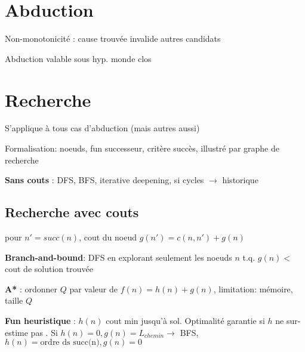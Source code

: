 \section*{Abduction}

Non-monotonicité : cause trouvée invalide autres candidats

Abduction valable sous hyp. monde clos

\section*{Recherche}

S'applique à tous cas d'abduction (mais autres aussi)

Formalisation: noeuds, fun successeur, critère succès, illustré par graphe de recherche

\textbf{Sans couts} : DFS, BFS, iterative deepening, si cycles $\rightarrow$ historique

\subsection*{Recherche avec couts}

pour $n' = succ(n)$, cout du noeud $g(n') = c(n, n') + g(n)$

\textbf{Branch-and-bound}: DFS en explorant seulement les noeuds $n$ t.q. $g(n) <$ cout de solution trouvée

\textbf{A*} : ordonner $Q$ par valeur de $f(n) = h(n) + g(n)$, limitation: mémoire, taille $Q$

\textbf{Fun heuristique} : $h(n)$ cout min jusqu'à sol. Optimalité garantie si $h$ ne sur-estime pas . Si $h(n) = 0, g(n) = L_{chemin} \rightarrow$ BFS, $h(n) = \text{ordre ds succ(n)}, g(n) = 0$